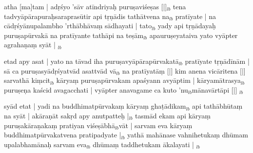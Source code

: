 \documentclass[article,12pt,a4paper]{memoir}%
\newcounter{parCount}
\begin{document}
	  
	  \pstart \leavevmode%
	atha [ma]tam | adṛśyo 'sāv atīndriyaḥ puruṣaviśeṣas [|]{\tiny $_{lb}$} tena tadvyāpārapuraḥsaraprasūtir api tṛṇādis tathātvena na{\tiny $_{lb}$} pratīyate | na cādṛśyānupalambho 'rthābhāvaṃ sādhayati | tato{\tiny $_{lb}$} yady api tṛṇādayaḥ puruṣapūrvakā na pratīyante tathāpi na teṣām{\tiny $_{lb}$} apauruṣeyataiva yato vyāpter agrahaṇaṃ syāt |
	{}
	\pend%
      {\tiny $_{lb}$}

	  
	  \pstart \leavevmode%
	etad apy asat | yato na tāvad iha puruṣavyāpārapūrvakatā{\tiny $_{lb}$} pratīyate tṛṇādīnām | sā ca puruṣasyādṛśyatvād asattvād vā{\tiny $_{lb}$} na pratīyatāṃ [|] kim anena vicāritena [|] sarvathā kiṃcit{\tiny $_{lb}$} kāryaṃ puruṣapūrvakam apaśyann avyāptim |\leavevmode{} kāryamātrasya{\tiny $_{lb}$} puruṣeṇa kaścid avagacchati | vyāpter anavagame ca kuto 'nu{\tiny $_{lb}$}mānavārtāpi [|]
	{}
	\pend%
      {\tiny $_{lb}$}

	  
	  \pstart \leavevmode%
	syād etat | yadi na buddhimatpūrvakaṃ kāryaṃ ghaṭādikam{\tiny $_{lb}$} api tathābhūtaṃ na syāt | akāraṇāt sakṛd apy anutpatteḥ |{\tiny $_{lb}$} tasmād ekam api kāryaṃ puruṣakāraṇakaṃ pratiyan viśeṣābhā{\tiny $_{lb}$}vāt | sarvam eva kāryaṃ buddhimatpūrvakatvena pratipadyate |{\tiny $_{lb}$} yathā mahānase vahnihetukaṃ dhūmam upalabhamānaḥ sarvam eva{\tiny $_{lb}$} dhūmaṃ taddhetukam ākalayati |
	{}
	\pend%
      {\tiny $_{lb}$}
\end{document}
